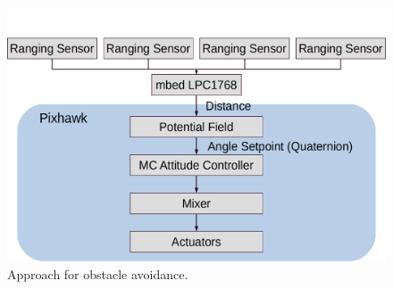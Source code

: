 \begin{figure}
	\centering
	\includegraphics[width=0.8\linewidth]{pictures/approach.pdf}
	\caption{Approach for obstacle avoidance.}
	\label{fig:approach}
\end{figure}
